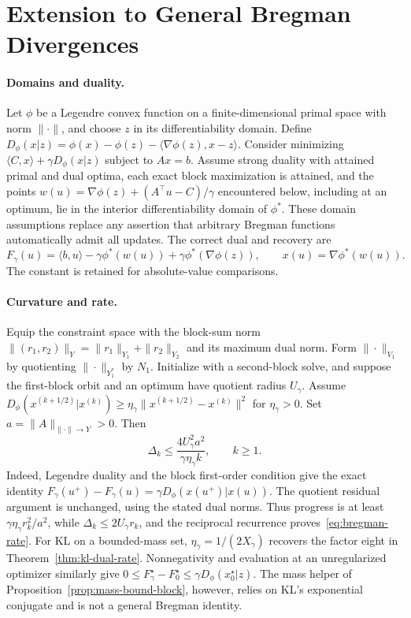 \section{Extension to General Bregman Divergences}\label{app-app:general-bregman}
\paragraph{Domains and duality.}
Let $\phi$ be a Legendre convex function on a finite-dimensional primal space with norm $\|\cdot\|$, and choose $z$ in its differentiability domain. Define $D_\phi(x|z)=\phi(x)-\phi(z)-\langle\nabla\phi(z),x-z\rangle$. Consider minimizing $\langle C,x\rangle+\gamma D_\phi(x|z)$ subject to $Ax=b$. Assume strong duality with attained primal and dual optima, each exact block maximization is attained, and the points
$w(u)=\nabla\phi(z)+(A^\top u-C)/\gamma$
encountered below, including at an optimum, lie in the interior differentiability domain of $\phi^*$. These domain assumptions replace any assertion that arbitrary Bregman functions automatically admit all updates. The correct dual and recovery are
\begin{equation}\label{eq:bregman-dual}
 F_\gamma(u)=\langle b,u\rangle-\gamma\phi^*(w(u))
 +\gamma\phi^*(\nabla\phi(z)),\qquad x(u)=\nabla\phi^*(w(u)).
\end{equation}
The constant is retained for absolute-value comparisons.

\paragraph{Curvature and rate.}
Equip the constraint space with the block-sum norm $\|(r_1,r_2)\|_Y=\|r_1\|_{Y_1}+\|r_2\|_{Y_2}$ and its maximum dual norm. Form $\|\cdot\|_{V_1}$ by quotienting $\|\cdot\|_{Y_1^*}$ by $N_1$. Initialize with a second-block solve, and suppose the first-block orbit and an optimum have quotient radius $U_\gamma$. Assume
$D_\phi(x^{(k+1/2)}|x^{(k)})\geq\eta_\gamma\|x^{(k+1/2)}-x^{(k)}\|^2$
for $\eta_\gamma>0$. Set $a=\|A\|_{\|\cdot\|\to Y}>0$. Then
\begin{equation}\label{eq:bregman-rate}
 \Delta_k\leq\frac{4U_\gamma^2a^2}{\gamma\eta_\gamma k},\qquad k\geq1.
\end{equation}
Indeed, Legendre duality and the block first-order condition give the exact identity $F_\gamma(u^+)-F_\gamma(u)=\gamma D_\phi(x(u^+)|x(u))$. The quotient residual argument is unchanged, using the stated dual norms. Thus progress is at least $\gamma\eta_\gamma r_k^2/a^2$, while $\Delta_k\leq2U_\gamma r_k$, and the reciprocal recurrence proves~\eqref{eq:bregman-rate}. For KL on a bounded-mass set, $\eta_\gamma=1/(2X_\gamma)$ recovers the factor eight in Theorem~\ref{thm:kl-dual-rate}. Nonnegativity and evaluation at an unregularized optimizer similarly give $0\leq F_\gamma^\star-F_0^\star\leq\gamma D_\phi(x_0^\star|z)$. The mass helper of Proposition~\ref{prop:mass-bound-block}, however, relies on KL's exponential conjugate and is not a general Bregman identity.

